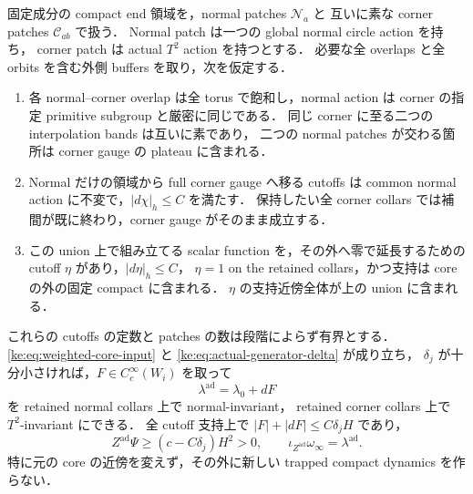 \begin{proposition}
\label{ke:star-cover-adapted-primitive}
固定成分の compact end 領域を，normal patches $\mathcal N_a$ と
互いに素な corner patches $\mathcal C_{ab}$ で扱う．
Normal patch は一つの global normal circle action を持ち，
corner patch は actual $T^2$ action を持つとする．
必要な全 overlaps と全 orbits を含む外側 buffers を取り，次を仮定する．
\begin{enumerate}
\item 各 normal--corner overlap は全 torus で飽和し，normal action は
corner の指定 primitive subgroup と厳密に同じである．
同じ corner に至る二つの interpolation bands は互いに素であり，
二つの normal patches が交わる箇所は corner gauge の plateau に含まれる．
\item Normal だけの領域から full corner gauge へ移る cutoffs は common normal
action に不変で，$|d\chi|_h\le C$ を満たす．
保持したい全 corner collars では補間が既に終わり，corner gauge がそのまま成立する．
\item この union 上で組み立てる scalar function を，その外へ零で延長するための
cutoff $\eta$ があり，$|d\eta|_h\le C$，
$\eta=1$ on the retained collars，かつ支持は core の外の固定 compact に含まれる．
$\eta$ の支持近傍全体が上の union に含まれる．
\end{enumerate}
これらの cutoffs の定数と patches の数は段階によらず有界とする．
\eqref{ke:eq:weighted-core-input} と \eqref{ke:eq:actual-generator-delta} が成り立ち，
$\delta_j$ が十分小さければ，$F\in C_c^\infty(W_i)$ を取って
\[
 \lambda^{\mathrm{ad}}=\lambda_0+dF
\]
を retained normal collars 上で normal-invariant，
retained corner collars 上で $T^2$-invariant にできる．
全 cutoff 支持上で $|F|+|dF|\le C\delta_jH$ であり，
\begin{equation}\label{ke:eq:adapted-nontrapping}
 Z^{\mathrm{ad}}\Psi\ge(c-C\delta_j)H^2>0,
 \qquad \iota_{Z^{\mathrm{ad}}}\omega_\infty=\lambda^{\mathrm{ad}}.
\end{equation}
特に元の core の近傍を変えず，その外に新しい trapped compact dynamics を作らない．
\end{proposition}

